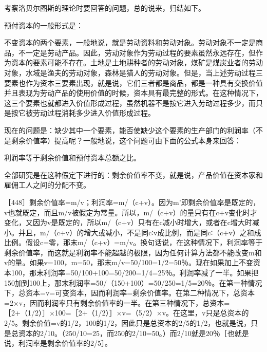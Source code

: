 
考察洛贝尔图斯的理论时要回答的问题，总的说来，归结如下。

预付资本的一般形式是：

\todo{}

不变资本的两个要素，一般地说，就是劳动资料和劳动对象。劳动对象不一定是商品，不一定是劳动产品。因此，劳动对象作为劳动过程的要素虽然永远存在，但作为资本的要素可能不存在。土地是土地耕种者的劳动对象，煤矿是煤炭业者的劳动对象，水域是渔夫的劳动对象，森林是猎人的劳动对象。但是，当上述劳动过程三要素也作为资本三要素出现，就是说，它们三者都是商品，都是一种具有交换价值并且表现为劳动产品的使用价值的时候，资本具有最完整的形式。在这种情况下，这三个要素也就都进入价值形成过程，虽然机器不是按它进入劳动过程多少，而只是按它被劳动过程消耗多少进入价值形成过程。

现在的问题是：缺少其中一个要素，能否使缺少这个要素的生产部门的利润率（不是剩余价值率）提高呢？一般地说，这个问题可由下面的公式本身来回答：

利润率等于剩余价值和预付资本总额之比。

全部研究是在这种假定下进行的：剩余价值率不变，就是说，产品价值在资本家和雇佣工人之间的分配不变。

［448］剩余价值率=m/v；利润率=m/（c+v）。因为m’即剩余价值率是既定的，v也就既定，而且m/v被假定为常量。所以，m/（c+v）的量只有在c+v变化时才变化，又因为v是既定的，所以m/（c+v）只有在c减小时增大，或者在c增大时减小。并且，m/（c+v）的增大或减小，不是同c∶v成比例，而是同c∶（c+v）之和成比例。假设c=零，那末m/（c+v）=m/v。换句话说，在这种情况下，利润率等于剩余价值率，而这就是利润率不能超越的极限，因为任何计算方法都不能改变m和v的量。如果v=100，m=50，那末m/v=50/100=1/2=50％。现在如果加上不变资本100，那末利润率=50/100+100=50/200=1/4=25％。利润率减了一半。如果把150加到100上，那末利润率=50/（150+100）=50/250=1/5=20％。在第一种情况下，总资本=v=可变资本，因而利润率=剩余价值率。在第二种情况下，总资本=2×v，因而利润率只有剩余价值率的一半。在第三种情况下，总资本=［2+（1/2）］×100=［2+（1/2）］×v=（5/2）×v。在这里，v只是总资本的2/5。剩余价值=v的1/2，100的1/2，因此只是总资本的2/5的1/2，也就是说，只是总资本的2/10。（250/10=25，而250的2/10=50。）而2/10就是20％［也就是说，利润率是剩余价值率的2/5］。

